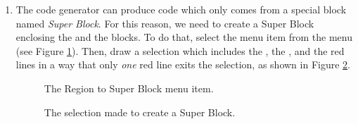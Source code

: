 \begin{enumerate}
\item
  The code generator can produce code which only comes from a special
  block named {\em Super Block}. For this reason, we need to create a
  Super Block enclosing the  and the 
  blocks. To do that, select the  menu
  item from the  menu (see Figure
  \ref{fig:region2sb}). Then, draw a selection which includes the
  , the , and the red lines in a way that only
  {\em one} red line exits the selection, as shown in Figure
  \ref{fig:sb}.
%
\begin{figure}[htb]
\caption{The Region to Super Block menu item.}
\label{fig:region2sb}
\end{figure}
%
\begin{figure}[htb]
\caption{The selection made to create a Super Block.}
\label{fig:sb}
\end{figure}


\end{enumerate}
